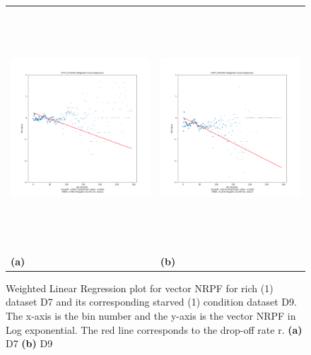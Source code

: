 \documentclass[a4,center,fleqn]{NAR}
\begin{document}
\begin{figure} [ht]
\centering
\begin{tabular}{ll}
\includegraphics[width=9cm,height=9cm]{D7FP_D7mRNA.Log.WLR.png} & \includegraphics[width=9cm,height=9cm]{D9FP_D9mRNA.Log.WLR.png} \\
\textbf{(a)}   & \textbf{(b)}     \\[0.1pt]
\end{tabular}
\caption{Weighted Linear Regression plot for vector NRPF for rich (1)  dataset D7 and its corresponding starved (1) condition dataset D9. The x-axis is the bin number and the y-axis is the vector NRPF in Log exponential. The red line corresponds to the drop-off rate r.
\textbf{(a)} D7
\textbf{(b)} D9
}
\label{fig4}
\end{figure} 
\end{document}
